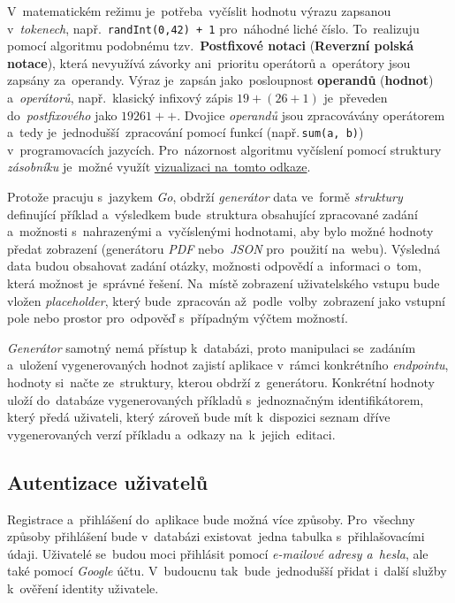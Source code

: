 \documentclass[11pt,a4paper]{report}
\begin{document}
            V~matematickém režimu je~potřeba~vyčíslit hodnotu výrazu zapsanou v~\emph{tokenech}, např.~\texttt{randInt(0,42) + 1} pro~náhodné liché číslo. To~realizuju pomocí algoritmu podobnému tzv.~\textbf{Postfixové notaci} (\textbf{Reverzní polská notace}), která nevyužívá závorky ani~prioritu operátorů a~operátory jsou zapsány za~operandy. Výraz je~zapsán jako~posloupnost \textbf{operandů} (\textbf{hodnot}) a~\emph{operátorů}, např.~klasický infixový zápis $19 + ( 26 + 1 )$ je~převeden do~\emph{postfixového} jako $19 26 1 + +$. Dvojice \emph{operandů} jsou zpracovávány operátorem a~tedy je~jednodušší~zpracování pomocí funkcí (např.\,\texttt{sum(a, b)}) v~programovacích jazycích. Pro~názornost algoritmu vyčíslení pomocí struktury \emph{zásobníku} je~možné využít \href{https://www.free-online-calculator-use.com/postfix-evaluator.html#}{vizualizaci na~tomto odkaze}. \cite{postfixnotation}

            Protože pracuju s~jazykem \emph{Go}, obdrží \emph{generátor} data ve~formě \emph{struktury} definující příklad a~výsledkem bude~struktura obsahující zpracované zadání a~možnosti s~nahrazenými a~vyčíslenými hodnotami, aby bylo možné hodnoty předat zobrazení (generátoru \emph{PDF} nebo~\emph{JSON} pro~použití na~webu). Výsledná data budou obsahovat zadání otázky, možnosti odpovědí a~informaci o~tom, která možnost je~správné řešení. Na~místě zobrazení uživatelského vstupu bude vložen \emph{placeholder}, který bude~zpracován až~podle~volby~zobrazení jako vstupní pole nebo prostor pro~odpověď s~případným výčtem možností.
            
            \emph{Generátor} samotný nemá přístup k~databázi, proto manipulaci se~zadáním a~uložení vygenerovaných hodnot zajistí aplikace v~rámci konkrétního \emph{endpointu}, hodnoty si~načte ze~struktury, kterou obdrží z~generátoru. Konkrétní hodnoty uloží do~databáze vygenerovaných příkladů s~jednoznačným identifikátorem, který předá uživateli, který zároveň bude mít k~dispozici seznam dříve vygenerovaných verzí příkladu a~odkazy na~k~jejich~editaci.

        \subsection{Autentizace uživatelů}
            Registrace a~přihlášení do~aplikace bude možná více způsoby. Pro~všechny způsoby přihlášení bude v~databázi existovat~jedna tabulka s~přihlašovacími údaji. Uživatelé se~budou moci přihlásit pomocí \emph{e-mailové adresy a~hesla}, ale také pomocí \emph{Google} účtu. V~budoucnu tak~bude~jednodušší přidat i~další služby k~ověření identity uživatele.
            
\end{document}
